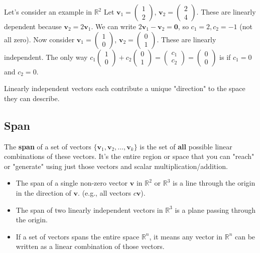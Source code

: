 \documentclass[11pt]{article}
\begin{document}
Let's consider an example in $\mathbb{R}^2$
Let $\mathbf{v}_1 = \begin{pmatrix} 1 \\ 2 \end{pmatrix}$, $\mathbf{v}_2 = \begin{pmatrix} 2 \\ 4 \end{pmatrix}$. These are linearly dependent because $\mathbf{v}_2 = 2\mathbf{v}_1$. We can write $2\mathbf{v}_1 - \mathbf{v}_2 = \mathbf{0}$, so $c_1=2, c_2=-1$ (not all zero).
Now consider $\mathbf{v}_1 = \begin{pmatrix} 1 \\ 0 \end{pmatrix}$, $\mathbf{v}_2 = \begin{pmatrix} 0 \\ 1 \end{pmatrix}$. These are linearly independent. The only way $c_1\begin{pmatrix} 1 \\ 0 \end{pmatrix} + c_2\begin{pmatrix} 0 \\ 1 \end{pmatrix} = \begin{pmatrix} c_1 \\ c_2 \end{pmatrix} = \begin{pmatrix} 0 \\ 0 \end{pmatrix}$ is if $c_1=0$ and $c_2=0$.

Linearly independent vectors each contribute a unique "direction" to the space they can describe.

\subsection{Span}
The \textbf{span} of a set of vectors $\{\mathbf{v}_1, \mathbf{v}_2, \dots, \mathbf{v}_k\}$ is the set of \textbf{all} possible linear combinations of these vectors. It's the entire region or space that you can "reach" or "generate" using just those vectors and scalar multiplication/addition.

\begin{example}
    \begin{itemize}
    \item The span of a single non-zero vector $\mathbf{v}$ in $\mathbb{R}^2$ or $\mathbb{R}^3$ is a line through the origin in the direction of $\mathbf{v}$. (e.g., all vectors $c\mathbf{v}$).
    \item The span of two linearly independent vectors in $\mathbb{R}^3$ is a plane passing through the origin.
    \item If a set of vectors spans the entire space $\mathbb{R}^n$, it means any vector in $\mathbb{R}^n$ can be written as a linear combination of those vectors.
\end{itemize}
\end{example}
\end{document}
